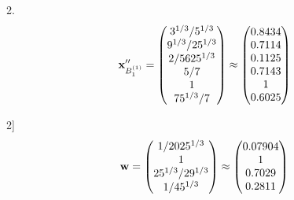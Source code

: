 \documentclass[10pt,a4paper]{article}
\begin{document}
	2.
	\[
		\bold{x}''_{B_1^{(1)}} = 
		\begin{pmatrix}
			{{3^ {1 / 3}}} / {{5^ {1 / 3}}} \\
			{{9^ {1 / 3}}} / {{25^ {1 / 3}}} \\
			{{2}} / {{5625^ {1 / 3}}} \\
			{{5}} / {{7}} \\
			{1}{} \\
			{{75^ {1 / 3}}} / {{7}} \\
		\end{pmatrix}
		\approx
		\begin{pmatrix}
			0.8434   \\
			0.7114   \\
			0.1125   \\
			0.7143   \\
			1        \\
			0.6025   \\
		\end{pmatrix}
	\]

	2]
	\[
		\bold{w} = 
		\begin{pmatrix}
			{1} / {{2025^ {1 / 3}}} \\
			{1}{} \\
			{{25^ {1 / 3}}} / {{2}{9^ {1 / 3}}} \\
			{1} / {{45^ {1 / 3}}} \\
		\end{pmatrix}
		\approx
		\begin{pmatrix}
			0.07904  \\
			1        \\
			0.7029   \\
			0.2811   \\
		\end{pmatrix}
	\]
\end{document}
